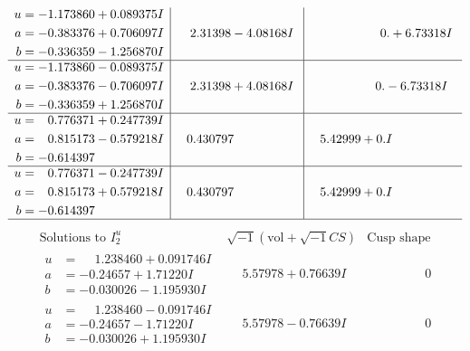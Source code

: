 \documentclass[1p]{elsarticle_modified}
\theoremstyle{definition}
\newcommand{\I}{\sqrt{-1}}
\begin{document}
$$\begin{array}{c|c|c}
\begin{aligned}
u &= -1.173860 + 0.089375 I \\
a &= -0.383376 + 0.706097 I \\
b &= -0.336359 - 1.256870 I\end{aligned}
 & \phantom{-}2.31398 - 4.08168 I & \phantom{-0.000000 -}0. + 6.73318 I \\ \hline\begin{aligned}
u &= -1.173860 - 0.089375 I \\
a &= -0.383376 - 0.706097 I \\
b &= -0.336359 + 1.256870 I\end{aligned}
 & \phantom{-}2.31398 + 4.08168 I & \phantom{-0.000000 } 0. - 6.73318 I \\ \hline\begin{aligned}
u &= \phantom{-}0.776371 + 0.247739 I \\
a &= \phantom{-}0.815173 - 0.579218 I \\
b &= -0.614397\phantom{ +0.000000I}\end{aligned}
 & \phantom{-}0.430797\phantom{ +0.000000I} & \phantom{-}5.42999 + 0. I\phantom{ +0.000000I} \\ \hline\begin{aligned}
u &= \phantom{-}0.776371 - 0.247739 I \\
a &= \phantom{-}0.815173 + 0.579218 I \\
b &= -0.614397\phantom{ +0.000000I}\end{aligned}
 & \phantom{-}0.430797\phantom{ +0.000000I} & \phantom{-}5.42999 + 0. I\phantom{ +0.000000I}\\
 \hline 
 \end{array}$$\newpage$$\begin{array}{c|c|c}  
\text{Solutions to }I^u_{2}& \I (\text{vol} + \sqrt{-1}CS) & \text{Cusp shape}\\
 \hline 
\begin{aligned}
u &= \phantom{-}1.238460 + 0.091746 I \\
a &= -0.24657 + 1.71220 I \\
b &= -0.030026 - 1.195930 I\end{aligned}
 & \phantom{-}5.57978 + 0.76639 I & \phantom{-0.000000 } 0 \\ \hline\begin{aligned}
u &= \phantom{-}1.238460 - 0.091746 I \\
a &= -0.24657 - 1.71220 I \\
b &= -0.030026 + 1.195930 I\end{aligned}
 & \phantom{-}5.57978 - 0.76639 I & \phantom{-0.000000 } 0 \\ \hline\begin{aligned}

\end{aligned}
\end{array}$$
\end{document}
